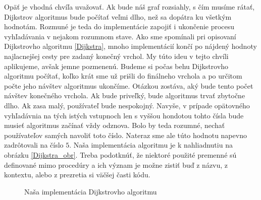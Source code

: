 Opäť je vhodná chvíľa uvažovať. Ak bude náš graf rozsiahly, s čím musíme rátať, Dijkstrov algoritmus bude počítať veľmi dlho, než sa dopátra ku všetkým hodnotám. Rozmuné je teda do implementácie zapojiť i ukončenie procesu vyhľadávania v nejakom rozumnom stave. Ako sme spomínali pri opisovaní Dijkstrovho algoritmu \ref{Dijkstra}, mnoho implementácií končí po nájdený hodnoty najlacnejšej cesty pre zadaný konečný vrchol. My túto ideu v tejto chvíli aplikujeme, avšak jemne pozmenenú. Budeme si počas behu Dijkstrovho algoritmu počítať, koľko krát sme už prišli do finálneho vrchola a po určitom počte jeho návštev algoritmus ukončíme. Otázkou zostáva, aký bude tento počet návštev konečného vrchola. Ak bude priveľký, bude algoritmus trvať zbytočne dlho. Ak zasa malý, používateľ bude nespokojný. Navyše, v prípade opätovného vyhľadávnia na tých istých vstupnoch len s vyššou hondotou tohto čísla bude musieť algoritmus začínať vždy odznova. Bolo by teda rozumné, nechať používateľov samých navoliť toto číslo. Nateraz sme ale túto hodnotu napevno zadrôtovali na číslo $5$. Naša implementácia algoritmu je k nahliadnutiu na obrázku \ref{Dijkstra_obr}. Treba podotknúť, že niektoré použité premenné sú definované mimo procedúry a ich význam je možne zistiť buď z názvu, z kontextu, alebo z prezretia si väčšej časti kódu.\newline

\begin{figure}[H]
  \caption{Naša implementácia Dijkstrovho algoritmu}
  \label{Dijsktra_obr}
\end{figure}


